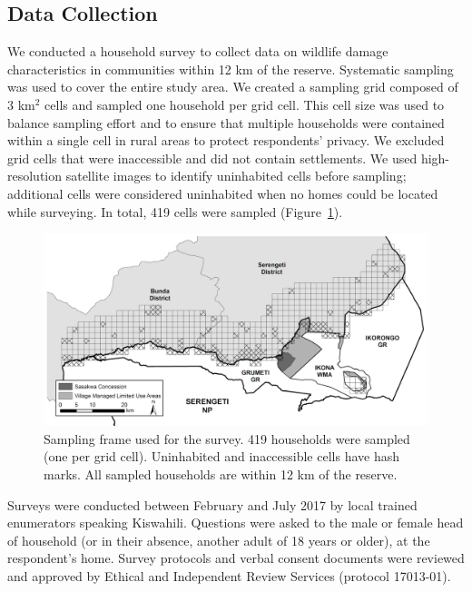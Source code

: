 \documentclass[12pt,]{article}
\begin{document}
\subsection{Data Collection}
We conducted a household survey to collect data on wildlife damage characteristics in communities within 12 km of the reserve. Systematic sampling was used to cover the entire study area. We created a sampling grid composed of 3 km$^2$ cells and sampled one household per grid cell. This cell size was used to balance sampling effort and to ensure that multiple households were contained within a single cell in rural areas to protect respondents' privacy. We excluded grid cells that were inaccessible and did not contain settlements. We used high-resolution satellite images to identify uninhabited cells before sampling; additional cells were considered uninhabited when no homes could be located while surveying. In total, 419 cells were sampled (Figure~\ref{fig:sampling_schema}).

\begin{figure}
    \centering
    \includegraphics[width=\textwidth]{Figures/sampling_survey.png} %
    \caption{Sampling frame used for the survey. 419 households were sampled (one per grid cell). Uninhabited and inaccessible cells have hash marks. All sampled households are within 12 km of the reserve.}
    \label{fig:sampling_schema}
\end{figure}

Surveys were conducted between February and July 2017 by local trained enumerators speaking Kiswahili. Questions were asked to the male or female head of household (or in their absence, another adult of 18 years or older), at the respondent’s home. Survey protocols and verbal consent documents were reviewed and approved by Ethical and Independent Review Services (protocol 17013-01).
\end{document}

